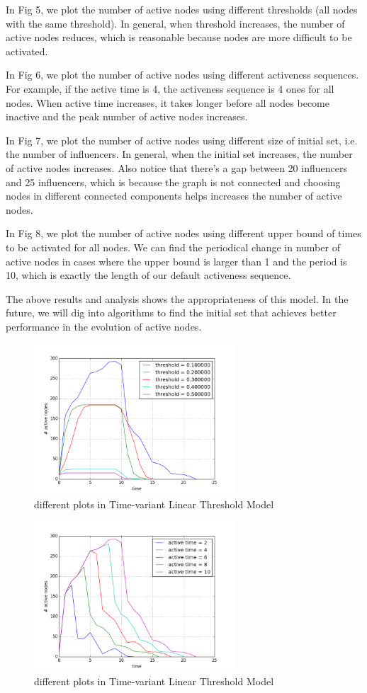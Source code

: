 \documentclass{article}
\begin{document}
In Fig 5, we plot the number of active nodes using different thresholds (all nodes with the same threshold). In general, when threshold increases, the number of active nodes reduces, which is reasonable because nodes are more difficult to be activated.

In Fig 6, we plot the number of active nodes using different activeness sequences. For example, if the active time is 4, the activeness sequence is 4 ones for all nodes. When active time increases, it takes longer before all nodes become inactive and the peak number of active nodes increases.

In Fig 7, we plot the number of active nodes using different size of initial set, i.e. the number of influencers. In general, when the initial set increases, the number of active nodes increases. Also notice that there’s a gap between 20 influencers and 25 influencers, which is because the graph is not connected and choosing nodes in different connected components helps increases the number of active nodes.

In Fig 8, we plot the number of active nodes using different upper bound of times to be activated for all nodes. We can find the periodical change in number of active nodes in cases where the upper bound is larger than 1 and the period is 10, which is exactly the length of our default activeness sequence.

The above results and analysis shows the appropriateness of this model. In the future, we will dig into algorithms to find the initial set that achieves better performance in the evolution of active nodes.

\begin{figure}[H]
\centering
\includegraphics[width=7.5cm]{yzplot1.png}
\caption{different plots in Time-variant Linear Threshold Model}
\end{figure}

\begin{figure}[H]
\centering
\includegraphics[width=7.5cm]{yzplot2.png}
\caption{different plots in Time-variant Linear Threshold Model}
\end{figure}
\end{document}
